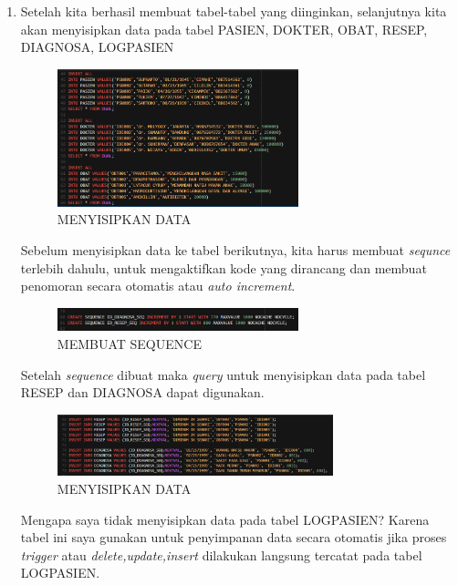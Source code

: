\documentclass[a4paper, 12pt]{article}
\begin{document}
\begin{enumerate}
\item Setelah kita berhasil membuat tabel-tabel yang diinginkan, selanjutnya kita akan menyisipkan data pada tabel PASIEN, DOKTER, OBAT, RESEP, DIAGNOSA, LOG\textunderscore PASIEN
\begin{figure}[h]
\begin{center}
\includegraphics[width=7cm]{figure/I1.png}
\caption{MENYISIPKAN DATA}
\end{center}
\end{figure}

Sebelum menyisipkan data ke tabel berikutnya, kita harus membuat \textit{sequnce} terlebih dahulu, untuk mengaktifkan kode yang dirancang dan membuat penomoran secara otomatis atau \textit{auto increment}.
\begin{figure}[h]
\begin{center}
\includegraphics[width=7cm]{figure/SQ.png}
\caption{MEMBUAT SEQUENCE}
\end{center}
\end{figure}

Setelah \textit{sequence} dibuat maka \textit{query} untuk menyisipkan data pada tabel RESEP dan DIAGNOSA dapat digunakan.
\begin{figure}[h]
\begin{center}
\includegraphics[width=8cm]{figure/I2.png}
\caption{MENYISIPKAN DATA}
\end{center}
\end{figure}

Mengapa saya tidak menyisipkan data pada tabel LOG\textunderscore PASIEN? Karena tabel ini saya gunakan untuk penyimpanan data secara otomatis jika proses \textit{trigger} atau \textit{delete,update,insert} dilakukan langsung tercatat pada tabel LOG\textunderscore PASIEN. \\


\end{enumerate}
\end{document}

